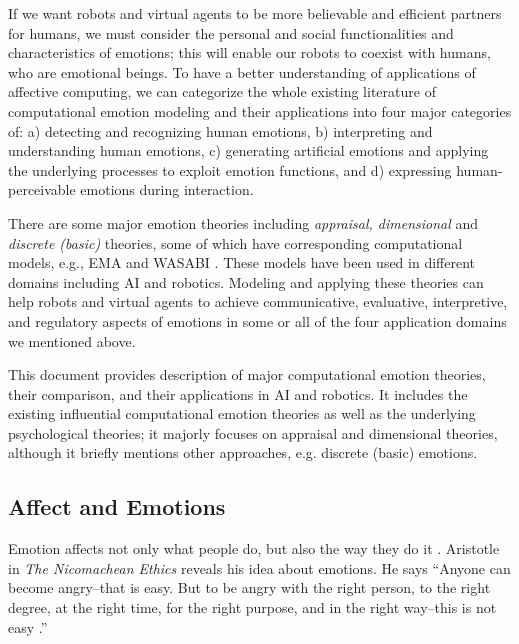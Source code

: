\documentclass[12pt]{report}
\begin{document}
If we want robots and virtual agents to be more believable and efficient
partners for humans, we must consider the personal and social functionalities
and characteristics of emotions; this will enable our robots to coexist with
humans, who are emotional beings. To have a better understanding of applications
of affective computing, we can categorize the whole existing literature of
computational emotion modeling and their applications into four major categories
of: a) detecting and recognizing human emotions, b) interpreting and
understanding human emotions, c) generating artificial emotions and applying the
underlying processes to exploit emotion functions, and d) expressing
human-perceivable emotions during interaction.

There are some major emotion theories including \textit{appraisal, dimensional}
and \textit{discrete (basic)} theories, some of which have corresponding
computational models, e.g., EMA \cite{marsella:ema-process-model} and WASABI
\cite{becker:wasabi,becker:wasabi-description}. These models have been used in
different domains including AI and robotics. Modeling and applying these
theories can help robots and virtual agents to achieve communicative,
evaluative, interpretive, and regulatory aspects of emotions in some or all of
the four application domains we mentioned above.

This document provides description of major computational emotion theories,
their comparison, and their applications in AI and robotics. It includes the
existing influential computational emotion theories as well as the underlying
psychological theories; it majorly focuses on appraisal and dimensional
theories, although it briefly mentions other approaches, e.g. discrete (basic)
emotions.

\subsection{Affect and Emotions}
Emotion affects not only what people do, but also the way they do it
\cite{cowie:concepts-definitions}. Aristotle in \emph{The Nicomachean Ethics}
reveals his idea about emotions. He says ``Anyone can become angry--that is
easy. But to be angry with the right person, to the right degree, at the right
time, for the right purpose, and in the right way--this is not easy
\cite{aristotle:ethics}.''
\end{document}
